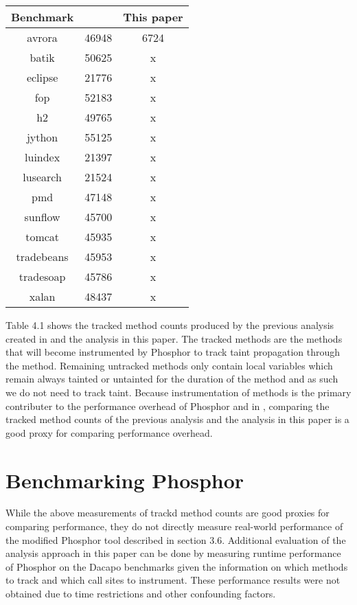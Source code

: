 \begin{center}
  \begin{tabular}{|c|c|c|}
    \hline
    Benchmark & \cite{manoj_project} & This paper \\ \hline
    avrora & 46948 & 6724 \\\hline
    batik & 50625 & x \\\hline
    eclipse & 21776 & x \\\hline
    fop & 52183 & x \\\hline
    h2 & 49765 & x \\\hline
    jython & 55125 & x \\\hline
    luindex & 21397 & x \\\hline
    lusearch & 21524 & x \\\hline
    pmd & 47148 & x \\\hline
    sunflow & 45700 & x \\\hline
    tomcat & 45935 & x \\\hline
    tradebeans & 45953 & x \\\hline
    tradesoap & 45786 & x \\\hline
    xalan & 48437 & x \\\hline
  \end{tabular}
\end{center}

Table 4.1 shows the tracked method counts produced by the previous analysis created in \cite{manoj_project} and the analysis in this paper. The tracked methods are the methods that will become instrumented by Phosphor to track taint propagation through the method. Remaining untracked methods only contain local variables which remain always tainted or untainted for the duration of the method and as such we do not need to track taint. Because instrumentation of methods is the primary contributer to the performance overhead of Phosphor and in \cite{manoj_phosphor}, comparing the tracked method counts of the previous analysis and the analysis in this paper is a good proxy for comparing performance overhead.

\section{Benchmarking Phosphor}
While the above measurements of trackd method counts are good proxies for comparing performance, they do not directly measure real-world performance of the modified Phosphor tool described in section 3.6. Additional evaluation of the analysis approach in this paper can be done by measuring runtime performance of Phosphor on the Dacapo benchmarks given the information on which methods to track and which call sites to instrument. These performance results were not obtained due to time restrictions and other confounding factors.
